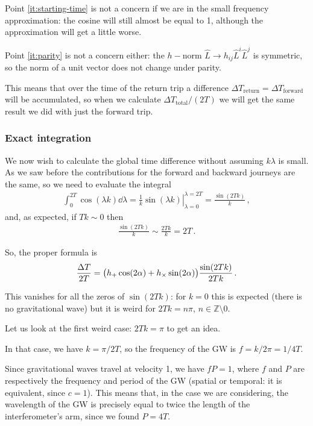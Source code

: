 \documentclass[main.tex]{subfiles}
\begin{document}
Point \ref{it:starting-time} is not a concern if we are in the small frequency approximation: the cosine  will still almost be equal to 1, although the approximation will get a little worse. 

Point \ref{it:parity} is not a concern either: the \(h-\)norm \(\hat{L} \rightarrow h_{ij} \hat{L}^{i} \hat{L}^{j}\) is symmetric, so the norm of a unit vector does not change under parity.

This means that over the time of the return trip a difference \(\Delta T _{\text{return}} = \Delta T _{\text{forward}}\) will be accumulated, so when we calculate \(\Delta T _{\text{total}} / (2T)\) we will get the same result we did with just the forward trip. 

\subsubsection{Exact integration}

We now wish to calculate the global time difference without assuming \(k \lambda \) is small. As we saw before the contributions for the forward and backward journeys are the same, so we need to evaluate the integral 
%
\begin{align}
\int_{0}^{2T} \cos(\lambda k) \dd{\lambda } 
= \left. \frac{1}{k} \sin(\lambda k ) \right\vert_{\lambda = 0}^{\lambda = 2T} = \frac{\sin(2Tk)}{k} 
\,,
\end{align}
%
and, as expected, if \(Tk \sim 0\) then 
%
\begin{align}
\frac{\sin(2Tk)}{k} \sim \frac{2Tk}{k} = 2T
\,.
\end{align}

So, the proper formula is 
%
\begin{align}
\frac{\Delta T}{2T} = 
\qty(h_{+} \cos(2 \alpha ) + h_{ \times } \sin(2 \alpha ))
\frac{\sin(2Tk)}{2Tk}
\,.
\end{align}

This vanishes for all the zeros of \(\sin(2Tk)\): for \(k=0\) this is expected (there is no gravitational wave) but it is weird for \(2Tk = n \pi \), \(n \in \mathbb{Z} \setminus \qty{0}\). 

Let us look at the first weird case: \(2Tk = \pi \) to get an idea. 

In that case, we have \(k =  \pi / 2T \), so the frequency of the GW is \(f = k / 2 \pi  =  1/ 4 T\). 

Since gravitational waves travel at velocity 1, we have \(fP = 1\), where \(f\) and \(P\) are respectively the  frequency and period of the GW (spatial or temporal: it is equivalent, since \(c=1\)). 
This means that, in the case we are considering, the wavelength of the GW is precisely equal to twice the length of the interferometer's arm, since we found \(P = 4T\). 
\end{document}
